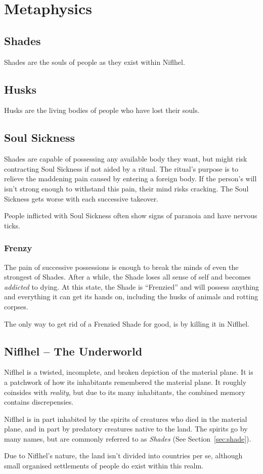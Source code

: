 \section{Metaphysics}
\subsection{Shades}
Shades are the souls of people as they exist within Niflhel.
\subsection{Husks}
Husks are the living bodies of people who have lost their souls.
\subsection{Soul Sickness}
Shades are capable of possessing any available body they want, but might risk contracting Soul Sickness if not aided by a ritual.
The ritual's purpose is to relieve the maddening pain caused by entering a foreign body.
If the person's will isn't strong enough to withstand this pain, their mind risks cracking.
The Soul Sickness gets worse with each successive takeover.

People inflicted with Soul Sickness often show signs of paranoia and have nervous ticks.
\subsubsection{Frenzy}
The pain of successive possessions is enough to break the minds of even the strongest of Shades.
After a while, the Shade loses all sense of self and becomes \textit{addicted} to dying.
At this state, the Shade is ``Frenzied'' and will possess anything and everything it can get its hands on, including the husks of animals and rotting corpses.

The only way to get rid of a Frenzied Shade for good, is by killing it in Niflhel.
\subsection{Niflhel -- The Underworld}
Niflhel is a twisted, incomplete, and broken depiction of the material plane.
It is a patchwork of how its inhabitants remembered the material plane.
It roughly coinsides with \textit{reality}, but due to its many inhabitants, the combined memory contains discrepensies.

Niflhel is in part inhabited by the spirits of creatures who died in the material plane, and in part by predatory creatures native to the land.
The spirits go by many names, but are commonly referred to as \textit{Shades} (See Section~\ref{sec:shade}).

Due to Niflhel's nature, the land isn't divided into countries per se, although small organised settlements of people do exist within this realm.